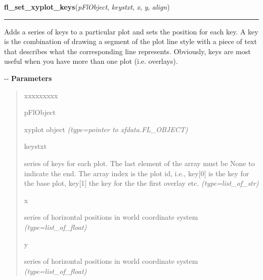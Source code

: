     \label{xformslib:flxyplot:fl_set_xyplot_keys}

    \vspace{0.5ex}

\hspace{.8\funcindent}\begin{boxedminipage}{\funcwidth}

    \raggedright \textbf{fl\_set\_xyplot\_keys}(\textit{pFlObject}, \textit{keystxt}, \textit{x}, \textit{y}, \textit{align})

    \vspace{-1.5ex}

    \rule{\textwidth}{0.5\fboxrule}
\setlength{\parskip}{2ex}

Adds a series of keys to a particular plot and sets the position for
each key. A key is the combination of drawing a segment of the plot line
style with a piece of text that describes what the corresponding line
represents. Obviously, keys are most useful when you have more than one
plot (i.e. overlays).

-{}-
\setlength{\parskip}{1ex}
      \textbf{Parameters}
      \vspace{-1ex}

      \begin{quote}
        \begin{Ventry}{xxxxxxxxx}

          \item[pFlObject]


xyplot object
            {\it (type=pointer to xfdata.FL\_OBJECT)}

          \item[keystxt]


series of keys for each plot. The last element of the array must be
None to indicate the end. The array index is the plot id, i.e., key{[}0{]}
is the key for the base plot, key{[}1{]} the key for the the first overlay
etc.
            {\it (type=list\_of\_str)}

          \item[x]


series of horizontal positions in world coordinate system
            {\it (type=list\_of\_float)}

          \item[y]


series of horizontal positions in world coordinate system
            {\it (type=list\_of\_float)}


\end{Ventry}
\end{quote}
\end{boxedminipage}
